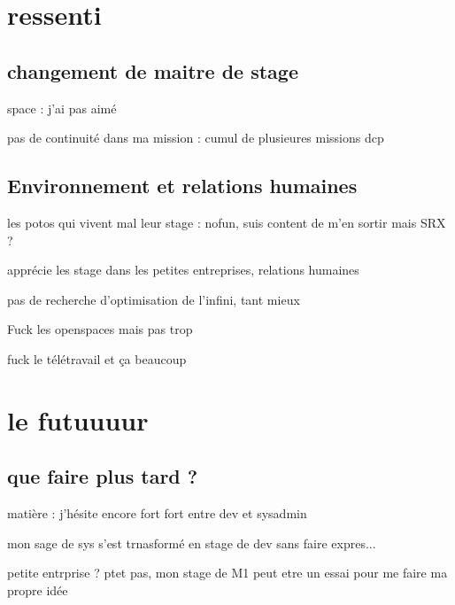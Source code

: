 \section{ressenti}
\subsection{changement de maitre de stage}
space : j'ai pas aimé

pas de continuité dans ma mission : cumul de plusieures missions dcp

\subsection{Environnement et relations humaines}
les potos qui vivent mal leur stage : nofun, suis content de m'en sortir mais SRX ?

apprécie les stage dans les petites entreprises, relations humaines

pas de recherche d'optimisation de l'infini, tant mieux

Fuck les openspaces mais pas trop

fuck le télétravail et ça beaucoup


\section{le futuuuur}
\subsection{que faire plus tard ?}
matière : j'hésite encore fort fort entre dev et sysadmin

mon sage de sys s'est trnasformé en stage de dev sans faire expres...

petite entrprise ? ptet pas, mon stage de M1 peut etre un essai pour me faire ma propre idée


